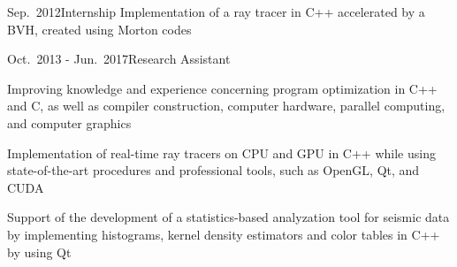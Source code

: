 \documentclass[a4paper,10pt]{cv}
\begin{document}
  \bigskip
      \begin{cvTimeItem}{Sep.~2012}{Internship}
        Implementation of a ray tracer in C++ accelerated by a BVH, created using Morton codes
      \end{cvTimeItem}
      \begin{cvTimeItem}{Oct.~2013 - Jun.~2017}{Research Assistant}
        \begin{cvItemize}
          \item Improving knowledge and experience concerning program optimization in C++ and C, as well as compiler construction, computer hardware, parallel computing, and computer graphics
          \item Implementation of real-time ray tracers on CPU and GPU in C++ while using state-of-the-art procedures and professional tools, such as OpenGL, Qt, and CUDA
          \item Support of the development of a statistics-based analyzation tool for seismic data by implementing histograms, kernel density estimators and color tables in C++ by using Qt
        \end{cvItemize}
      \end{cvTimeItem}
\end{document}

